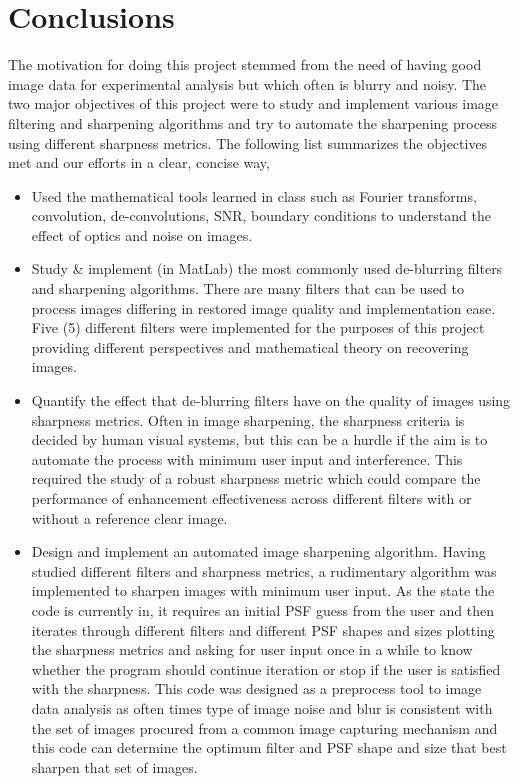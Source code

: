 
\section{Conclusions}
The motivation for doing this project stemmed from the need of having good image data for experimental analysis but which often is blurry and noisy. The two major objectives of this project were to study and implement various image filtering and sharpening algorithms and try to automate the sharpening process using different sharpness metrics. The following list summarizes the objectives met and our efforts in a clear, concise way,

\begin{itemize}
\item Used the mathematical tools learned in class such as Fourier transforms, convolution, de-convolutions, SNR, boundary conditions to understand the effect of optics and noise on images.
\item Study \& implement (in MatLab) the most commonly used de-blurring filters and sharpening algorithms. There are many filters that can be used to process images differing in restored image quality and implementation ease. Five (5) different filters were implemented for the purposes of this project providing different perspectives and mathematical theory on recovering images.
\item Quantify the effect that de-blurring filters have on the quality of images using sharpness metrics. Often in image sharpening, the sharpness criteria is decided by human visual systems, but this can be a hurdle if the aim is to automate the process with minimum user input and interference. This required the study of a robust sharpness metric which could compare the performance of enhancement effectiveness across different filters with or without a reference clear image.
\item Design and implement an automated image sharpening algorithm. Having studied different filters and sharpness metrics, a rudimentary algorithm was implemented to sharpen images with minimum user input. As the state the code is currently in, it requires an initial PSF guess from the user and then iterates through different filters and different PSF shapes and sizes plotting the sharpness metrics and asking for user input once in a while to know whether the program should continue iteration or stop if the user is satisfied with the sharpness. This code was designed as a preprocess tool to image data analysis as often times type of image noise and blur is consistent with the set of images procured from a common image capturing mechanism and this code can determine the optimum filter and PSF shape and size that best sharpen that set of images. 
\end{itemize}


\newpage